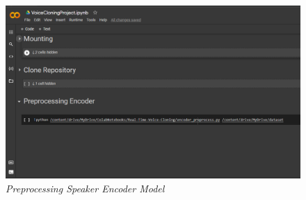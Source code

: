 \begin{enumerate}
\begin{figure}[H]
    \centering
    \includegraphics[scale=0.35]{figures/colab8}
    \caption{\textit{Preprocessing Speaker Encoder Model}}
    \label{colab8}
\end{figure}

\end{enumerate}